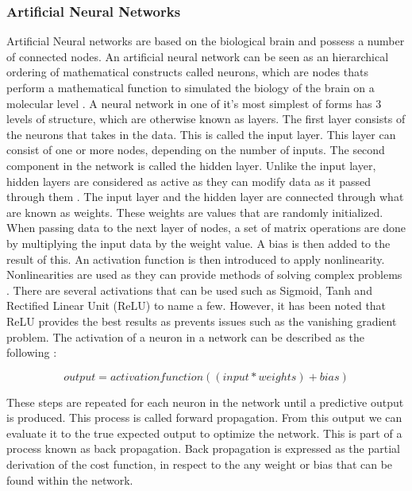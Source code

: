 \subsubsection{Artificial Neural Networks}
Artificial Neural networks are based on the biological brain and possess a number of connected nodes. An artificial neural network can be seen as an hierarchical ordering of mathematical constructs called neurons, which are nodes thats perform a mathematical function to simulated the biology of the brain on a molecular level \citep{muir}.  A neural network in one of it's most simplest of forms has 3 levels of structure, which are otherwise known as layers. The first layer consists of the neurons that takes in the data. This is called the input layer. This layer can consist of one or more nodes, depending on the number of inputs. The second component in the network is called the hidden layer. Unlike the input layer, hidden layers are considered as active as they can modify data as it passed through them \citep{smith_2011}. The input layer and the hidden layer are connected through what are known as weights. These weights are values that are randomly initialized. When passing data to the next layer of nodes, a set of matrix operations are done by multiplying the input data by the weight value. A bias is then added to the result of this. An activation function is then introduced to apply nonlinearity. Nonlinearities are used as they can provide methods of solving complex problems \citep{raschka_2016}. There are several activations that can be used such as Sigmoid, Tanh and Rectified Linear Unit (ReLU) to name a few. However, it has been noted that ReLU provides the best results as prevents issues such as the vanishing gradient problem. The activation of a neuron in a network can be described as the following \citep{collis_2017}:

\begin{equation}\label{eq:act}
output = activation function((input * weights) + bias)
\end{equation}

These steps are repeated for each neuron in the network until a predictive output is produced. This process is called forward propagation. From this output we can evaluate it to the true expected output to optimize the network. This is part of a process known as back propagation. Back propagation is expressed as the partial derivation of the cost function, in respect to the any weight or bias \citep{nielsen_2015} that can be found within the network.

